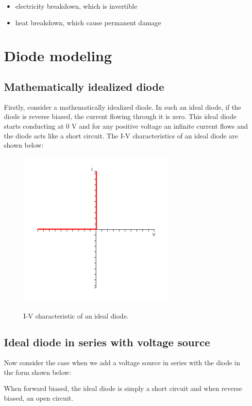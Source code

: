 \begin{itemize}
\item electricity breakdown, which is invertible
\item heat breakdown, which cause permanent damage
\end{itemize}

\section{Diode modeling}

\subsection{Mathematically idealized diode}

Firstly, consider a mathematically idealized diode. In such an ideal diode, if the diode is reverse biased, the current flowing through it is zero. This ideal diode starts conducting at 0 V and for any positive voltage an infinite current flows and the diode acts like a short circuit. The I-V characteristics of an ideal diode are shown below:

\begin{figure}[H]
  \centering
  \includegraphics[width=0.4\linewidth]{figures/Diode_Modelling_Image5.png}
  \label{fig:}
  \caption{I-V characteristic of an ideal diode.}
\end{figure}

\subsection{Ideal diode in series with voltage source}

Now consider the case when we add a voltage source in series with the diode in the form shown below:

When forward biased, the ideal diode is simply a short circuit and when reverse biased, an open circuit.

